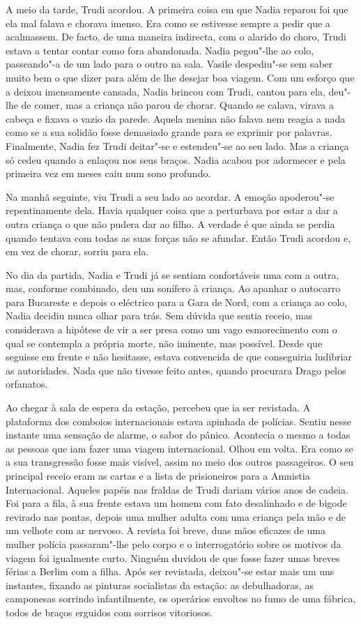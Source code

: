 A meio da tarde, Trudi acordou. A primeira coisa em
que Nadia reparou foi que ela mal falava e chorava imenso. Era como se
estivesse sempre a pedir que a acalmassem. De facto, de uma maneira
indirecta, com o alarido do choro, Trudi estava a tentar contar como
fora abandonada. Nadia pegou"-lhe ao colo, passeando"-a de um lado para o
outro na sala. Vasile despediu"-se sem saber muito bem o que dizer para
além de lhe desejar boa viagem. Com um esforço que a deixou imensamente
cansada, Nadia brincou com Trudi, cantou para ela, deu"-lhe de comer, mas
a criança não parou
de chorar. Quando se calava, virava a cabeça e fixava o vazio da parede.
Aquela menina não falava nem reagia a nada como se a sua solidão fosse
demasiado grande para se exprimir por palavras. Finalmente, Nadia fez
Trudi deitar"-se e estendeu"-se ao seu lado. Mas a criança só cedeu quando
a enlaçou nos seus braços. Nadia acabou por adormecer e pela primeira
vez em meses caiu num sono profundo.

Na manhã seguinte, viu Trudi a seu lado ao acordar. A emoção apoderou"-se
repentinamente dela. Havia qualquer coisa que a perturbava por estar a
dar a outra criança o que não pudera dar ao filho. A verdade é que ainda
se perdia quando tentava com todas as suas forças não se afundar. Então
Trudi acordou e, em vez de chorar, sorriu para ela.

No dia da partida, Nadia e Trudi já se sentiam confortáveis uma com a
outra, mas, conforme combinado, deu um sonífero à criança. Ao apanhar o
autocarro para Bucareste e depois o eléctrico para a Gara de Nord, com
a criança ao colo, Nadia decidiu nunca olhar para trás. Sem dúvida que
sentia receio, mas considerava a hipótese de vir a ser presa como um
vago esmorecimento com o qual se contempla a própria morte, não
iminente, mas possível. Desde que seguisse em frente e não hesitasse,
estava convencida de que conseguiria ludibriar as autoridades. Nada
que não tivesse feito antes, quando procurara Drago pelos orfanatos.

Ao chegar à sala de espera da estação, percebeu que ia ser revistada. A
plataforma dos comboios internacionais
estava apinhada de polícias. Sentiu nesse instante uma sensação de
alarme, o sabor do pânico. Acontecia o mesmo a todas as pessoas que iam
fazer uma viagem internacional. Olhou em volta. Era como se a sua
transgressão fosse mais visível, assim no meio dos outros passageiros. O
seu principal receio eram as cartas e a lista de prisioneiros para a
Amnistia Internacional. Aqueles papéis nas fraldas de Trudi dariam
vários anos de cadeia. Foi para a fila, à sua frente estava um homem com
fato desalinhado e de bigode revirado nas pontas, depois uma mulher
adulta com uma criança pela mão e de um velhote com ar nervoso. A
revista foi breve, duas mãos eficazes de uma mulher polícia passaram"-lhe
pelo corpo e o interrogatório sobre os motivos da viagem foi
igualmente curto. Ninguém duvidou de que fosse fazer umas breves férias
a Berlim com a filha. Após ser revistada, deixou"-se estar mais um uns
instantes, fixando as pinturas socialistas da estação: as debulhadoras, as camponesas sorrindo infantilmente, os operários envoltos no fumo
de uma fábrica, todos de braços erguidos com sorrisos vitoriosos.

